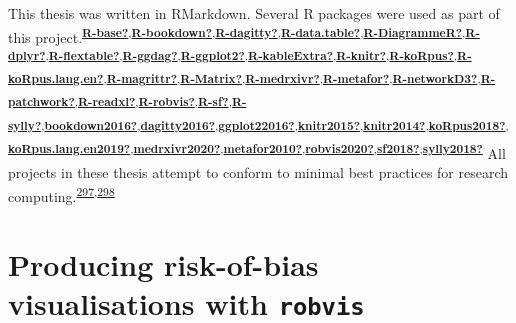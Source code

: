 \documentclass[a4paper, twoside]{templates/ociamthesis}
\begin{document}
This thesis was written in RMarkdown. Several R packages were used as part of this project.\textsuperscript{\protect\hyperlink{ref-R-base}{\textbf{R-base?}},\protect\hyperlink{ref-R-bookdown}{\textbf{R-bookdown?}},\protect\hyperlink{ref-R-dagitty}{\textbf{R-dagitty?}},\protect\hyperlink{ref-R-data.table}{\textbf{R-data.table?}},\protect\hyperlink{ref-R-DiagrammeR}{\textbf{R-DiagrammeR?}},\protect\hyperlink{ref-R-dplyr}{\textbf{R-dplyr?}},\protect\hyperlink{ref-R-flextable}{\textbf{R-flextable?}},\protect\hyperlink{ref-R-ggdag}{\textbf{R-ggdag?}},\protect\hyperlink{ref-R-ggplot2}{\textbf{R-ggplot2?}},\protect\hyperlink{ref-R-kableExtra}{\textbf{R-kableExtra?}},\protect\hyperlink{ref-R-knitr}{\textbf{R-knitr?}},\protect\hyperlink{ref-R-koRpus}{\textbf{R-koRpus?}},\protect\hyperlink{ref-R-koRpus.lang.en}{\textbf{R-koRpus.lang.en?}},\protect\hyperlink{ref-R-magrittr}{\textbf{R-magrittr?}},\protect\hyperlink{ref-R-Matrix}{\textbf{R-Matrix?}},\protect\hyperlink{ref-R-medrxivr}{\textbf{R-medrxivr?}},\protect\hyperlink{ref-R-metafor}{\textbf{R-metafor?}},\protect\hyperlink{ref-R-networkD3}{\textbf{R-networkD3?}},\protect\hyperlink{ref-R-patchwork}{\textbf{R-patchwork?}},\protect\hyperlink{ref-R-readxl}{\textbf{R-readxl?}},\protect\hyperlink{ref-R-robvis}{\textbf{R-robvis?}},\protect\hyperlink{ref-R-sf}{\textbf{R-sf?}},\protect\hyperlink{ref-R-sylly}{\textbf{R-sylly?}},\protect\hyperlink{ref-bookdown2016}{\textbf{bookdown2016?}},\protect\hyperlink{ref-dagitty2016}{\textbf{dagitty2016?}},\protect\hyperlink{ref-ggplot22016}{\textbf{ggplot22016?}},\protect\hyperlink{ref-knitr2015}{\textbf{knitr2015?}},\protect\hyperlink{ref-knitr2014}{\textbf{knitr2014?}},\protect\hyperlink{ref-koRpus2018}{\textbf{koRpus2018?}},\protect\hyperlink{ref-koRpus.lang.en2019}{\textbf{koRpus.lang.en2019?}},\protect\hyperlink{ref-medrxivr2020}{\textbf{medrxivr2020?}},\protect\hyperlink{ref-metafor2010}{\textbf{metafor2010?}},\protect\hyperlink{ref-robvis2020}{\textbf{robvis2020?}},\protect\hyperlink{ref-sf2018}{\textbf{sf2018?}},\protect\hyperlink{ref-sylly2018}{\textbf{sylly2018?}}}
All projects in these thesis attempt to conform to minimal best practices for research computing.\textsuperscript{\protect\hyperlink{ref-wilson2014}{297},\protect\hyperlink{ref-wilson2017}{298}}

\hypertarget{appendix-robvis}{%
\section{\texorpdfstring{Producing risk-of-bias visualisations with \texttt{robvis}}{Producing risk-of-bias visualisations with robvis}}\label{appendix-robvis}}
\end{document}
